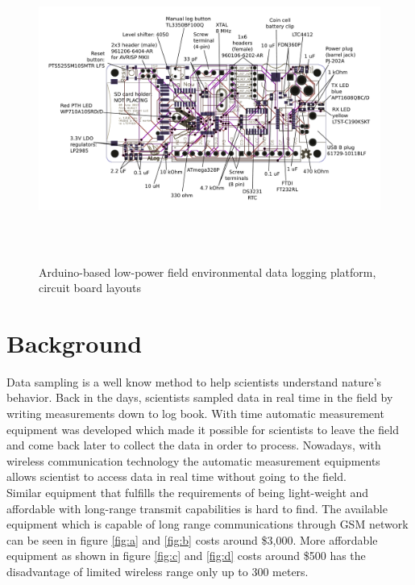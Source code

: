\begin{figure}
\centering
\includegraphics[height=10cm]{graphics/ALog_drawing}
\caption{Arduino-based low-power field environmental data logging platform, circuit board layouts\label{fig:BottleLog}\cite{ALog-BottleLogger}}
\end{figure}

\section{Background}
Data sampling is a well know method to help scientists understand nature's behavior. Back in the days, scientists sampled data in real time in the field by writing measurements down to log book. With time automatic measurement equipment was developed which made it possible for scientists to leave the field and come back later to collect the data in order to process. Nowadays, with wireless communication technology the automatic measurement equipments allows scientist to access data in real time without going to the field.\\
Similar equipment that fulfills the requirements of being light-weight and affordable with long-range transmit capabilities is hard to find. The available equipment which is capable of long range communications through GSM network can be seen in figure \ref{fig:a} and \ref{fig:b} costs around \$3,000. More affordable equipment as shown in figure \ref{fig:c} and  \ref{fig:d} costs around \$500 has the disadvantage of limited wireless range only up to 300 meters.

